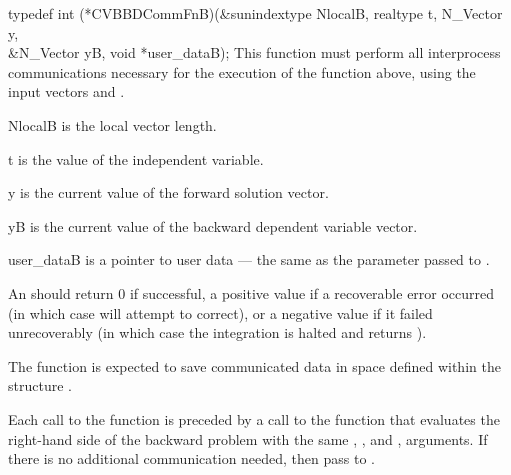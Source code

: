 {
  typedef int (*CVBBDCommFnB)(&sunindextype NlocalB, realtype t, N\_Vector y,\\
                              &N\_Vector yB, void *user\_dataB);
}
{
  This  function must perform all interprocess communications necessary
  for the execution of the  function above, using the input
  vectors  and .
}
{
  \begin{args}
  \item[NlocalB]
    is the local vector length.
  \item[t]
    is the value of the independent variable.
  \item[y]
    is the current value of the forward solution vector.
  \item[yB]
    is the current value of the backward dependent variable vector.
  \item[user\_dataB]
    is a pointer to user data --- the same as the 
    parameter passed to .
  \end{args}
}
{
  An  should return 0 if successful, a positive value if a recoverable
  error occurred (in which case {\cvodes} will attempt to correct), or a negative
  value if it failed unrecoverably (in which case the integration is halted and
   returns ).
}
{
  The  function is expected to save communicated data in space defined within the
  structure .

  Each call to the  function is preceded by a call to the function that
  evaluates the right-hand side of the backward problem with the same , ,
  and , arguments. If there is no additional communication needed, then
  pass  to .
}
